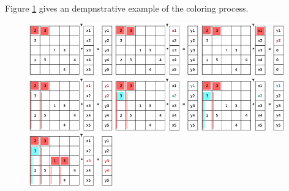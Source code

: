 \documentclass[a4paper,11pt]{scrartcl}
\begin{document}
Figure \ref{figure:coloring} gives an dempnstrative example of the coloring process.

\begin{figure}[ht]\label{figure:coloring}
\includegraphics[width=0.32\textwidth]{graphic/coloringT2.eps}\hfill\vline\hfill
\includegraphics[width=0.32\textwidth]{graphic/coloringT3.eps}\hfill\vline\hfill
\includegraphics[width=0.32\textwidth]{graphic/coloringT4.eps}
\includegraphics[width=0.32\textwidth]{graphic/coloringT5.eps}\hfill\vline\hfill
\includegraphics[width=0.32\textwidth]{graphic/coloringT6.eps}\hfill\vline\hfill
\includegraphics[width=0.32\textwidth]{graphic/coloringT7.eps}
\includegraphics[width=0.32\textwidth]{graphic/coloringT8.eps}\hfill\vline\hfill

\end{figure}
\end{document}
